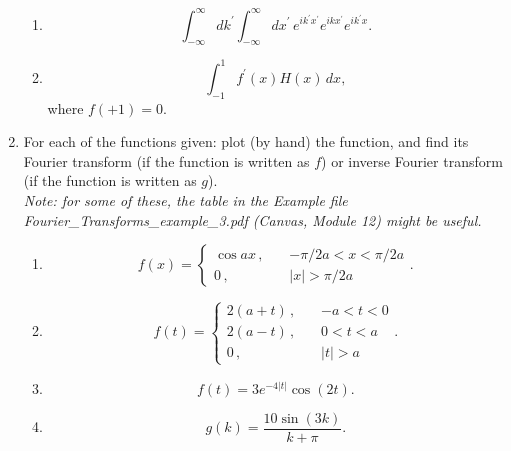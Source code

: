 \documentclass[fleqn]{article}
\begin{document}
\begin{enumerate}
\begin{enumerate}
    \item  
    \[
    \int_{-\infty }^{\infty }dk^{\prime }\int_{-\infty }^{\infty }dx^{\prime}\,e^{ik^{\prime }x^{\prime }}e^{ikx^{\prime }}e^{ik^{\prime }x}.
    \]
    
    \item  
    \[
    \int_{-1}^{1}f^{\prime }\left( x\right) H\left( x\right) \,dx,
    \]
    where $f\left( + 1\right) =0$.
    \end{enumerate}
    
    
    
    \item For each of the functions given: plot (by hand) the function, and find its Fourier transform (if the function is written as $f$) or inverse Fourier transform (if the function is written as $g$). \\
    {\it Note: for some of these, the table in the Example file Fourier\_Transforms\_example\_3.pdf (Canvas, Module 12)  might be useful. }
    
    \begin{enumerate}
    
    \item  
    \[
    f\left( x\right) =\left\{ 
    \begin{array}{rrr}
    \cos ax \, , & \, & -\pi /2a<x<\pi /2a \\ 
    0 \, , & \, & \left| x\right| >\pi /2a
    \end{array}
    \right. .
    \]
    
    \item  
    \[
    f\left( t\right) =\left\{ 
    \begin{array}{rrr}
    2\left( a+t\right) \, ,  & \, & -a<t<0 \\ 
    2\left( a-t\right) \, , & \, & 0<t<a \\ 
    0 \, , & \, & \left| t\right| >a
    \end{array}
    \right. .
    \]
    
    \item  
    \[
    f\left( t\right) =3e^{-4\left| t\right| }\cos \left( 2t\right).
    \]
    
    \item  
    \[
    g\left( k\right) =\frac{10\sin \left( 3k\right) }{k+\pi }.
    \]
    
    \end{enumerate}
    
     
    
  \end{enumerate}
\end{document}

